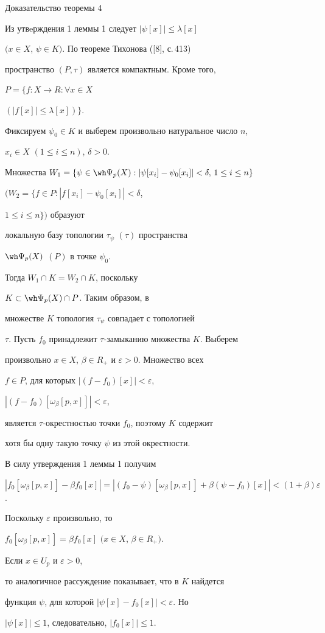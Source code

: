 \begin{pf*}{Доказательство теоремы 4}


Из утвeрждения 1 леммы 1 следует $|\psi[x]| \leq \lambda[x]$


$(x \in X$, $\psi \in K)$. По теореме Тихонова ([8], с.\,413)


пространство $(P,\tau)$ является компактным. Кроме того,


$P =  \{f : X \rightarrow  R : \forall x \in X$


$(|f[x]| \leq \lambda [x]) \}$.


Фиксируем $\psi_{0} \in K$ и выберем произвольно натуральное число $n$,


$x_{i} \in X$ $(1\leq i \leq n)$, $\delta >0$.


Множества $W_{1} = \{\psi \in \wh \Psi_{p}(X) : |\psi[x_{i}] -


\psi_{0}[x_{i}]| < \delta, \, 1\leq i \leq n \}$


$(W_{2} = \{f \in P : |f[x_{i}] - \psi_{0}[x_{i}]| < \delta$,


$1\leq i \leq n \})$ образуют


локальную базу топологии  $\tau_{\psi}$ $(\tau)$  пространства


$\wh \Psi_{p}(X)$ $(P)$ в точке $\psi_{0}$.


Тогда $W_{1}\cap K = W_{2}\cap K$, поскольку


$K \subset \wh \Psi_{p}(X)\cap P$. Таким образом, в 


множестве $K$ топология $\tau_{\psi}$ совпадает с топологией


$\tau$. Пусть $f_{0}$ принадлежит  $\tau$-замыканию множества $K$. Выберем


произвольно $x \in X$, $\beta \in R_{+}$ и $\varepsilon > 0$. Множество всех


$f \in P$, для которых $|(f - f_{0})[x]| < \varepsilon$,


$|(f - f_{0})[\omega_{\beta }[p,x]]| < \varepsilon$,


является $\tau$-окрестностью точки $f_{0}$, поэтому $K$ содержит


хотя бы одну такую точку $\psi$ из этой окрестности.


В силу утверждения 1 леммы 1 получим 


$|f_{0}[\omega_{\beta }[p,x]] - \beta f_{0}[x]| =


|(f_{0} - \psi)[\omega_{\beta }[p,x]] +


\beta(\psi - f_{0})[x]| < (1 + \beta) \varepsilon$.


Поскольку $\varepsilon$ произвольно, то


$f_{0}[\omega_{\beta }[p,x]]=\beta f_{0}[x]$ $(x\in X$, $\beta\in R_{+})$.


Если $x \in U_{p}$ и $\varepsilon > 0$,


то аналогичное рассуждение показывает, что в $K$ найдется 


функция $\psi$, для которой $|\psi[x] - f_{0}[x]| < \varepsilon$. Но


$|\psi[x]| \leq 1$, следовательно, $|f_{0}[x]| \leq 1$.


\end{pf*}





